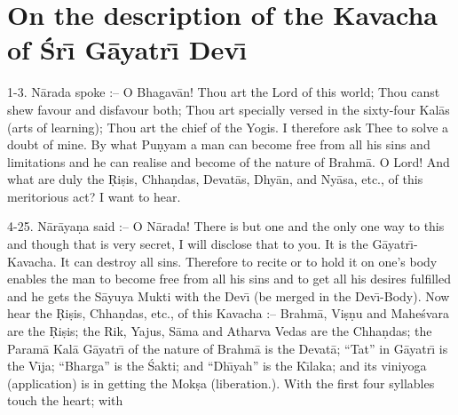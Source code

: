 \chapter{On the description of the Kavacha of \'Sr\={\i} G\=ayatr\={\i} Dev\={\i}}

1-3. N\=arada spoke :-- O Bhagav\=an! Thou art the Lord of this world; Thou canst shew favour and disfavour both; Thou art specially versed in the sixty-four Kal\=as (arts of learning); Thou art the chief of the Yogis. I therefore ask Thee to solve a doubt of mine. By what Pu\d{n}yam a man can become free from all his sins and limitations and he can realise and become of the nature of Brahm\=a. O Lord! And what are duly the \d{R}i\d{s}is, Chha\d{n}das, Devat\=as, Dhy\=an, and Ny\=asa, etc., of this meritorious act? I want to hear.

4-25. N\=ar\=aya\d{n}a said :-- O N\=arada! There is but one and the only one way to this and though that is very secret, I will disclose that to you. It is the G\=ayatr\={\i}-Kavacha. It can destroy all sins. Therefore to recite or to hold it on one's body enables the man to become free from all his sins and to get all his desires fulfilled and he gets the S\=ayuya Mukti with the Dev\={\i} (be merged in the Dev\={\i}-Body). Now hear the \d{R}i\d{s}is, Chha\d{n}das, etc., of this Kavacha :-- Brahm\=a, Vi\d{s}\d{n}u and Mahe\'svara are the \d{R}i\d{s}is; the Rik, Yajus, S\=ama and Atharva Vedas are the Chha\d{n}das; the Param\=a Kal\=a G\=ayatr\={\i} of the nature of Brahm\=a is the Devat\=a; ``Tat'' in G\=ayatr\={\i} is the V\={\i}ja; ``Bharga'' is the \'Sakti; and ``Dh\={\i}yah'' is the K\={\i}laka; and its viniyoga (application) is in getting the Mok\d{s}a (liberation.). With the first four syllables touch the heart; with

